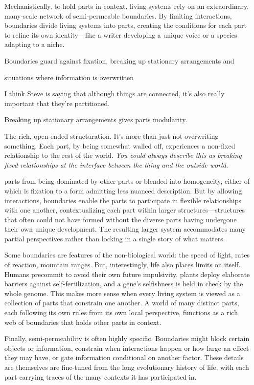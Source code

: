 \documentclass[11pt]{article}
\begin{document}
Mechanistically, to hold parts in context, living systems rely on an extraordinary, many-scale network of semi-permeable boundaries. By limiting interactions, boundaries divide living systems into parts, creating the conditions for each part to refine its own identity---like a writer developing a unique voice or a species adapting to a niche. 

Boundaries guard against fixation, breaking up stationary arrangements and 

situations where information is overwritten

I think Steve is saying that although things are connected, it's also really important that they're partitioned. 

Breaking up stationary arrangements gives parts modularity. 

The rich, open-ended structuration. It's more than just not overwriting something. Each part, by being somewhat walled off, experiences a non-fixed relationship to the rest of the world. \textit{You could always describe this as breaking fixed relationships at the interface between the thing and the outside world.} 

parts from being dominated by other parts or blended into homogeneity, either of which is fixation to a form admitting less nuanced description. But by allowing interactions, boundaries enable the parts to participate in flexible relationships with one another, contextualizing each part within larger structures---structures that often could not have formed without the diverse parts having undergone their own unique development. The resulting larger system accommodates many partial perspectives rather than locking in a single story of what matters.

Some boundaries are features of the non-biological world: the speed of light, rates of reaction, mountain ranges. But, interestingly, life also places limits on itself. Humans precommit to avoid their own future impulsivity, plants deploy elaborate barriers against self-fertilization, and a gene's selfishness is held in check by the whole genome. This makes more sense when every living system is viewed as a collection of parts that constrain one another. A world of many distinct parts, each following its own rules from its own local perspective, functions as a rich web of boundaries that holds other parts in context. 

Finally, semi-permeability is often highly specific. Boundaries might block certain objects or information, constrain when interactions happen or how large an effect they may have, or gate information conditional on another factor. These details are themselves are fine-tuned from the long evolutionary history of life, with each part carrying traces of the many contexts it has participated in. 
\end{document}
